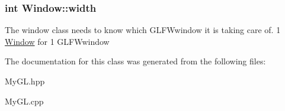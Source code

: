 \subsubsection[{\texorpdfstring{width}{width}}]{\setlength{\rightskip}{0pt plus 5cm}int Window\+::width}\hypertarget{classWindow_af5b1c436782cc9752d386493fbc5dc8c}{}\label{classWindow_af5b1c436782cc9752d386493fbc5dc8c}
The window class needs to know which G\+L\+F\+Wwindow it is taking care of. 1 \hyperlink{classWindow}{Window} for 1 G\+L\+F\+Wwindow 

The documentation for this class was generated from the following files\+:\begin{DoxyCompactItemize}
\item 
My\+G\+L.\+hpp\item 
My\+G\+L.\+cpp\end{DoxyCompactItemize}
